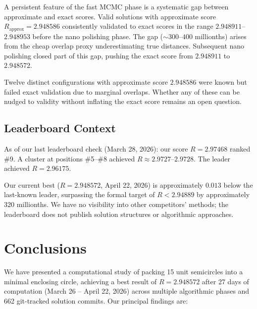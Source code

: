 \documentclass[11pt]{article}
\begin{document}
A persistent feature of the fast MCMC phase is a systematic gap between approximate and exact scores.
Valid solutions with approximate score $R_{\mathrm{approx}} = 2.948586$ consistently validated to exact scores in the range $2.948911$--$2.948953$ before the nano polishing phase. The gap (${\sim}300$--$400$ millionths) arises from the cheap overlap proxy underestimating true distances. Subsequent nano polishing closed part of this gap, pushing the exact score from $2.948911$ to $2.948572$.

Twelve distinct configurations with approximate score $2.948586$ were known but failed exact validation due to marginal overlaps. Whether any of these can be nudged to validity without inflating the exact score remains an open question.

\subsection{Leaderboard Context}

As of our last leaderboard check (March 28, 2026): our score $R = 2.97468$ ranked \#9. A cluster at positions \#5--\#8 achieved $R \approx 2.9727$--$2.9728$. The leader achieved $R = 2.96175$.

Our current best ($R = 2.948572$, April 22, 2026) is approximately $0.013$ below the last-known leader, surpassing the formal target of $R < 2.94889$ by approximately 320 millionths. We have no visibility into other competitors' methods; the leaderboard does not publish solution structures or algorithmic approaches.

\section{Conclusions}
\label{sec:conclusions}

We have presented a computational study of packing 15 unit semicircles into a minimal enclosing circle, achieving a best result of $R = 2.948572$ after 27 days of computation (March 26 -- April 22, 2026) across multiple algorithmic phases and 662 git-tracked solution commits. Our principal findings are:
\end{document}
